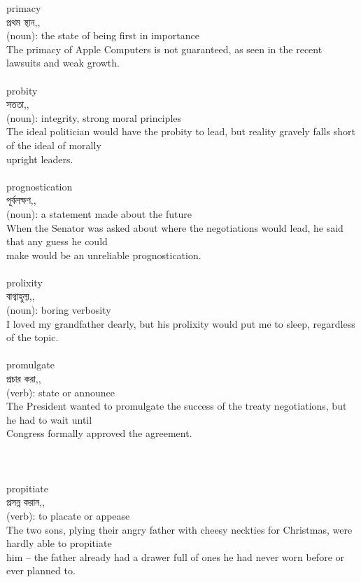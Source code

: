 \documentclass{article}
\begin{document}
{{primacy}\\
{প্রথম স্থান,,}\\
{(noun): the state of being first in importance\\The primacy of Apple Computers is not guaranteed, as seen in the recent lawsuits and weak growth.\\}\\
{probity}\\
{সততা,,}\\
{(noun): integrity, strong moral principles\\The ideal politician would have the probity to lead, but reality gravely falls short of the ideal of morally\\upright leaders.\\}\\
{prognostication}\\
{পূর্বলক্ষণ,,}\\
{(noun): a statement made about the future\\When the Senator was asked about where the negotiations would lead, he said that any guess he could\\make would be an unreliable prognostication.\\}\\
{prolixity}\\
{বাগ্বাহুল্য,,}\\
{(noun): boring verbosity\\I loved my grandfather dearly, but his prolixity would put me to sleep, regardless of the topic.\\}\\
{promulgate}\\
{প্রচার করা,,}\\
{(verb): state or announce\\The President wanted to promulgate the success of the treaty negotiations, but he had to wait until\\Congress formally approved the agreement.\\\\                                                                                  \\}\\
{propitiate}\\
{প্রসন্ন করান,,}\\
{(verb): to placate or appease\\The two sons, plying their angry father with cheesy neckties for Christmas, were hardly able to propitiate\\him -- the father already had a drawer full of ones he had never worn before or ever planned to.\\}\\
}
\end{document}
